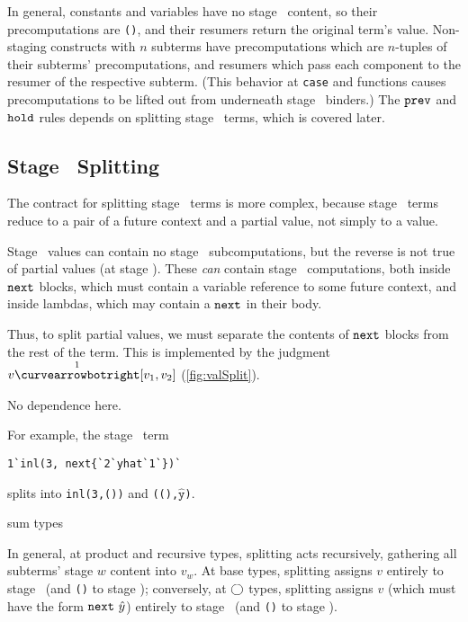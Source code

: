 In general, constants and variables have no stage \bbone\ content, so their
precomputations are \texttt{()}, and their resumers return the original term's
value. Non-staging constructs with $n$ subterms have precomputations which are
$n$-tuples of their subterms' precomputations, and resumers which pass each
component to the resumer of the respective subterm. (This behavior at
\texttt{case} and functions causes precomputations to be lifted out from 
underneath stage \bbtwo\ binders.) The ${\tt prev}$ and ${\tt hold}$ rules depends
on splitting stage \bbone\ terms, which is covered later.

\subsection{Stage \bbone\ Splitting}

\TODO
The contract for splitting stage \bbone\ terms is more complex, because stage \bbone\ 
terms reduce to a pair of a future context and a partial value, not simply to a value.





Stage \bbtwo\ values can contain no stage \bbone\ subcomputations, but the
reverse is not true of partial values (at stage \bbone). These \emph{can}
contain stage \bbtwo\ computations, both inside ${\tt next}$ blocks, which must
contain a variable reference to some future context, and inside lambdas, which
may contain a ${\tt next}$ in their body.

Thus, to split partial values, we must separate the contents of ${\tt next}$ blocks
from the rest of the term. This is implemented by the judgment $v \vsplito
[v_1,v_2]$ (\ref{fig:valSplit}). 

No dependence here.

For example, the stage \bbone\ term
\begin{lstlisting}
1`inl(3, next{`2`yhat`1`})`
\end{lstlisting}
splits into
\verb|inl(3,())| and \texttt{((),$\mathtt{\hat{y}}$)}.

sum types




In general,
at product and recursive types, splitting acts
recursively, gathering all subterms' stage $w$ content into $v_w$. At base
types, splitting assigns $v$ entirely to stage \bbone\ (and \texttt{()} to stage
\bbtwo); conversely, at $\bigcirc$ types, splitting assigns $v$ (which must have the
form ${\tt next}~\hat y$) entirely to stage \bbtwo\ (and \texttt{()} to stage
\bbone).

